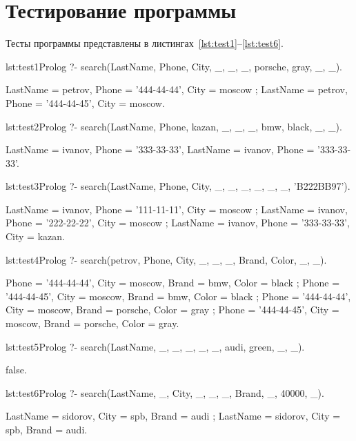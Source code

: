 \section{Тестирование программы}
Тесты программы представлены в листингах~\ref{lst:test1}--\ref{lst:test6}.

\begin{listing}{lst:test1}{Prolog}
?- search(LastName, Phone, City, _, _, _, porsche, gray, _, _).

LastName = petrov,
Phone = '444-44-44',
City = moscow ;
LastName = petrov,
Phone = '444-44-45',
City = moscow.
\end{listing}

\begin{listing}{lst:test2}{Prolog}
?- search(LastName, Phone, kazan, _, _, _, bmw, black, _, _).

LastName = ivanov,
Phone = '333-33-33',
LastName = ivanov,
Phone = '333-33-33'.
\end{listing}

\begin{listing}{lst:test3}{Prolog}
?- search(LastName, Phone, City, _, _, _, _, _, _, 'B222BB97').

LastName = ivanov,
Phone = '111-11-11',
City = moscow ;
LastName = ivanov,
Phone = '222-22-22',
City = moscow ;
LastName = ivanov,
Phone = '333-33-33',
City = kazan.
\end{listing}

\begin{listing}{lst:test4}{Prolog}
?- search(petrov, Phone, City, _, _, _, Brand, Color, _, _).

Phone = '444-44-44', City = moscow, Brand = bmw, Color = black ;
Phone = '444-44-45', City = moscow, Brand = bmw, Color = black ;
Phone = '444-44-44', City = moscow, Brand = porsche, Color = gray ;
Phone = '444-44-45', City = moscow, Brand = porsche, Color = gray.
\end{listing}

\begin{listing}{lst:test5}{Prolog}
?- search(LastName, _, _, _, _, _, audi, green, _, _).

false.
\end{listing}

\begin{listing}{lst:test6}{Prolog}
?- search(LastName, _, City, _, _, _, Brand, _, 40000, _).

LastName = sidorov, City = spb, Brand = audi ;
LastName = sidorov, City = spb, Brand = audi.
\end{listing}